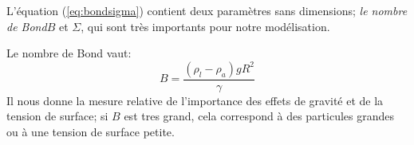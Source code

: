 
    L'équation (\ref{eq:bondsigma}) contient deux paramètres sans dimensions; \textit{le nombre de Bond}$B$ et $\Sigma$, qui sont très importants pour notre modélisation.

    Le nombre de Bond vaut:
    \begin{equation}
        B = \frac{(\rho_l-\rho_{a})gR^2}{\gamma}
    \end{equation}
    Il nous donne la mesure relative de l'importance des effets de gravité et de la tension de surface; si $B$ est tres grand, cela correspond à des particules grandes ou à une tension de surface petite. 




